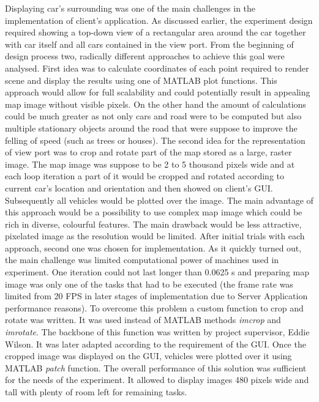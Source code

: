 \documentclass[11pt,english]{article}
\begin{document}
Displaying car's surrounding was one of the main challenges in the implementation of client's application. As discussed earlier, the experiment design required showing a top-down view of a rectangular area around the car together with car itself and all cars contained in the view port. From the beginning of design process two, radically different approaches to achieve this goal were analysed. First idea was to calculate coordinates of each point required to render scene and display the results using one of MATLAB plot functions. This approach would allow for full scalability and could potentially result in appealing map image without visible pixels. On the other hand the amount of calculations could be much greater as not only cars and road were to be computed but also multiple stationary objects around the road that were suppose to improve the felling of speed (such as trees or houses). 
The second idea for the representation of view port was to crop and rotate part of the map stored as a large, raster image. The  map image was suppose to be 2 to 5 thousand pixels wide and at each loop iteration a part of it would be cropped and rotated according to current car's location and orientation and then showed on client's GUI. Subsequently all vehicles would be plotted over the image. The main advantage of this approach would be a possibility to use complex map image which could be rich in diverse, colourful features. The main drawback would be less attractive, pixelated image as the resolution would be limited. 
After initial trials with each approach, second one was chosen for implementation. As it quickly turned out, the main challenge was limited computational power of machines used in experiment. One iteration could not last longer than 0.0625 s and preparing map image was only one of the tasks that had to be executed (the frame rate was limited from 20 FPS in later stages of implementation due to Server Application performance reasons). To overcome this problem a custom function to crop and rotate was written. It was used instead of MATLAB methods \textit{imcrop} and \textit{imrotate}. The backbone of this function was written by project supervisor, Eddie Wilson. It was later adapted according to the requirement of the GUI. 
Once the cropped image was displayed on the GUI, vehicles were plotted over it using MATLAB \textit{patch} function. The overall performance of this solution was sufficient for the needs of the experiment. It allowed to display images 480 pixels wide and tall with plenty of room left for remaining tasks.
\end{document}
